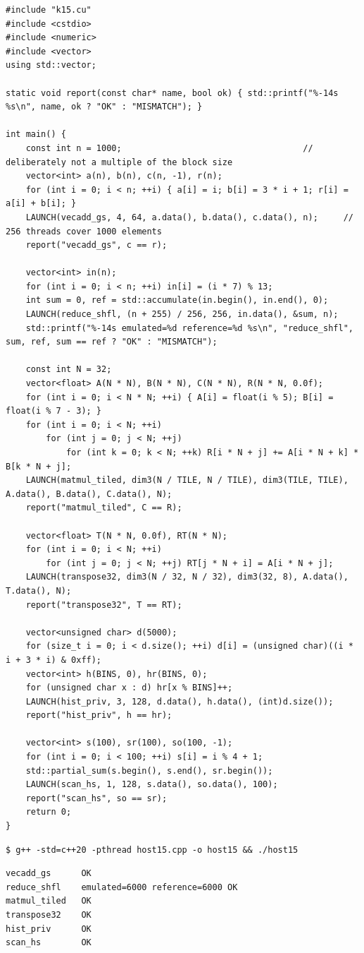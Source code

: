 \documentclass[10pt,a4paper,openany,oneside]{report}
\begin{document}
\begin{lstlisting}[language={[11]C++},basicstyle=\ttfamily\scriptsize,title={host15.cpp: CPU harness}]
#include "k15.cu"
#include <cstdio>
#include <numeric>
#include <vector>
using std::vector;

static void report(const char* name, bool ok) { std::printf("%-14s %s\n", name, ok ? "OK" : "MISMATCH"); }

int main() {
    const int n = 1000;                                    // deliberately not a multiple of the block size
    vector<int> a(n), b(n), c(n, -1), r(n);
    for (int i = 0; i < n; ++i) { a[i] = i; b[i] = 3 * i + 1; r[i] = a[i] + b[i]; }
    LAUNCH(vecadd_gs, 4, 64, a.data(), b.data(), c.data(), n);     // 256 threads cover 1000 elements
    report("vecadd_gs", c == r);

    vector<int> in(n);
    for (int i = 0; i < n; ++i) in[i] = (i * 7) % 13;
    int sum = 0, ref = std::accumulate(in.begin(), in.end(), 0);
    LAUNCH(reduce_shfl, (n + 255) / 256, 256, in.data(), &sum, n);
    std::printf("%-14s emulated=%d reference=%d %s\n", "reduce_shfl", sum, ref, sum == ref ? "OK" : "MISMATCH");

    const int N = 32;
    vector<float> A(N * N), B(N * N), C(N * N), R(N * N, 0.0f);
    for (int i = 0; i < N * N; ++i) { A[i] = float(i % 5); B[i] = float(i % 7 - 3); }
    for (int i = 0; i < N; ++i)
        for (int j = 0; j < N; ++j)
            for (int k = 0; k < N; ++k) R[i * N + j] += A[i * N + k] * B[k * N + j];
    LAUNCH(matmul_tiled, dim3(N / TILE, N / TILE), dim3(TILE, TILE), A.data(), B.data(), C.data(), N);
    report("matmul_tiled", C == R);

    vector<float> T(N * N, 0.0f), RT(N * N);
    for (int i = 0; i < N; ++i)
        for (int j = 0; j < N; ++j) RT[j * N + i] = A[i * N + j];
    LAUNCH(transpose32, dim3(N / 32, N / 32), dim3(32, 8), A.data(), T.data(), N);
    report("transpose32", T == RT);

    vector<unsigned char> d(5000);
    for (size_t i = 0; i < d.size(); ++i) d[i] = (unsigned char)((i * i + 3 * i) & 0xff);
    vector<int> h(BINS, 0), hr(BINS, 0);
    for (unsigned char x : d) hr[x % BINS]++;
    LAUNCH(hist_priv, 3, 128, d.data(), h.data(), (int)d.size());
    report("hist_priv", h == hr);

    vector<int> s(100), sr(100), so(100, -1);
    for (int i = 0; i < 100; ++i) s[i] = i % 4 + 1;
    std::partial_sum(s.begin(), s.end(), sr.begin());
    LAUNCH(scan_hs, 1, 128, s.data(), so.data(), 100);
    report("scan_hs", so == sr);
    return 0;
}
\end{lstlisting}
\begin{lstlisting}[style=shcmd,basicstyle=\ttfamily\scriptsize]
$ g++ -std=c++20 -pthread host15.cpp -o host15 && ./host15
\end{lstlisting}
\begin{lstlisting}[style=out,basicstyle=\ttfamily\scriptsize]
vecadd_gs      OK
reduce_shfl    emulated=6000 reference=6000 OK
matmul_tiled   OK
transpose32    OK
hist_priv      OK
scan_hs        OK
\end{lstlisting}
\end{document}
